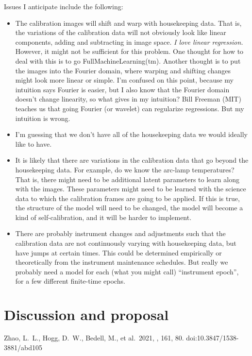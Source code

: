 \documentclass[modern]{aastex631}
\begin{document}
Issues I anticipate include the following:
\begin{itemize}
    \item The calibration images will shift and warp with housekeeping data.
    That is, the variations of the calibration data will not obviously look like linear components, adding and subtracting in image space.
    \emph{I love linear regression.} However, it might not be sufficient for this problem.
    One thought for how to deal with this is to go FullMachineLearning(tm).
    Another thought is to put the images into the Fourier domain, where warping and shifting changes might look more linear or simple.
    I'm confused on this point, because my intuition says Fourier is easier, but I also know that the Fourier domain doesn't change linearity, so what gives in my intuition?
    Bill Freeman (MIT) teaches us that going Fourier (or wavelet) can regularize regressions. But my intuition is wrong.
    \item
    I'm guessing that we don't have all of the housekeeping data we would ideally like to have.
    \item
    It is likely that there are variations in the calibration data that go beyond the housekeeping data.
    For example, do we know the arc-lamp temperatures?
    That is, there might need to be additional latent parameters to learn along with the images.
    These parameters might need to be learned with the science data to which the calibration frames are going to be applied.
    If this is true, the structure of the model will need to be changed, the model will become a kind of self-calibration, and it will be harder to implement.
    \item
    There are probably instrument changes and adjustments such that the calibration data are not continuously varying with housekeeping data, but have jumps at certain times.
    This could be determined empirically or theoretically from the instrument maintenance schedules.
    But really we probably need a model for each (what you might call) ``instrument epoch'', for a few different finite-time epochs.
\end{itemize}

\section{Discussion and proposal}\label{sec:proposal}\noindent

\begin{thebibliography}{}
 Zhao, L.~L., Hogg, D.~W., Bedell, M., et al.\ 2021, \aj, 161, 80. doi:10.3847/1538-3881/abd105
\end{thebibliography}
\end{document}

